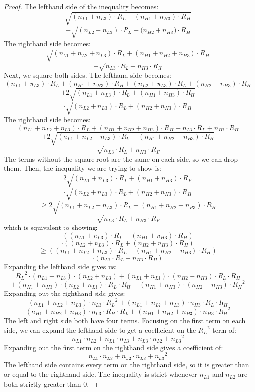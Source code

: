 \documentclass[sigconf]{acmart}
\newcommand{\p}[1]{\left( #1 \right)}
\newcommand{\nLv}[1]{\ensuremath{n_{L#1}}}
\newcommand{\nHv}[1]{\ensuremath{n_{H#1}}}
\newcommand{\RL}[0]{\ensuremath{R_L}}
\newcommand{\RH}[0]{\ensuremath{R_H}}
\newcommand{\cd}[0]{\cdot}
\begin{document}
\begin{proof}
The lefthand side of the inequality becomes: 
$$\sqrt{(\nLv{1} + \nLv{3}) \cd \RL + (\nHv{1} +\nHv{3}) \cd \RH} $$
$$+ \sqrt{(\nLv{2} + \nLv{3}) \cd \RL + (\nHv{2} + \nHv{3}}) \cd \RH$$
The righthand side becomes: 
$$\sqrt{(\nLv{1} + \nLv{2} + \nLv{3}) \cd \RL + (\nHv{1} + \nHv{2} + \nHv{3}) \cd \RH} $$
$$+ \sqrt{\nLv{3} \cd \RL + \nHv{3} \cd \RH}$$
Next, we square both sides. The lefthand side becomes: 
$$ (\nLv{1} + \nLv{3}) \cd \RL + (\nHv{1} + \nHv{3}) \cd \RH + (\nLv{2} + \nLv{3}) \cd \RL + (\nHv{2} + \nHv{3}) \cd \RH$$
$$+ 2\sqrt{(\nLv{1} + \nLv{3}) \cd \RL + (\nHv{1} + \nHv{3}) \cd \RH} $$
$$\cd \sqrt{(\nLv{2} + \nLv{3}) \cd \RL + (\nHv{2} + \nHv{3}) \cd \RH}$$
The righthand side becomes: 
$$(\nLv{1} + \nLv{2} + \nLv{3}) \cd \RL + (\nHv{1} + \nHv{2} + \nHv{3}) \cd \RH + \nLv{3} \cd \RL + \nHv{3} \cd \RH$$
$$+ 2\sqrt{(\nLv{1} + \nLv{2} + \nLv{3}) \cd \RL + (\nHv{1} + \nHv{2} + \nHv{3}) \cd \RH}$$
$$\cd  \sqrt{\nLv{3} \cd \RL + \nHv{3} \cd \RH}$$
The terms without the square root are the same on each side, so we can drop them. Then, the inequality we are trying to show is:
$$2\sqrt{(\nLv{1} + \nLv{3}) \cd \RL + (\nHv{1} + \nHv{3}) \cd \RH} $$
$$\cd  \sqrt{(\nLv{2} + \nLv{3})\cd \RL + (\nHv{2} + \nHv{3}) \cd \RH}$$
$$\geq  2\sqrt{(\nLv{1} + \nLv{2} + \nLv{3}) \cd \RL + (\nHv{1} + \nHv{2} + \nHv{3}) \cd \RH}$$
$$\cd  \sqrt{\nLv{3} \cd \RL + \nHv{3} \cd \RH}$$
which is equivalent to showing: 
$$\p{(\nLv{1} + \nLv{3}) \cd \RL + (\nHv{1} + \nHv{3}) \cd \RH} $$
$$\cd \p{(\nLv{2} + \nLv{3}) \cd \RL + (\nHv{2} + \nHv{3}) \cd \RH}$$
$$\geq \p{(\nLv{1} + \nLv{2} + \nLv{3}) \cd \RL + (\nHv{1} + \nHv{2} + \nHv{3}) \cd \RH}$$
$$\cd  \p{\nLv{3} \cd \RL + \nHv{3} \cd \RH}$$
Expanding the lefthand side gives us: 
$$\RL^2 \cd (\nLv{1} + \nLv{3}) \cd (\nLv{2} + \nLv{3}) + (\nLv{1} + \nLv{3}) \cd (\nHv{2} + \nHv{3}) \cd \RL \cd \RH$$
$$ + (\nHv{1} + \nHv{3}) \cd (\nLv{2} + \nLv{3}) \cd \RL \cd \RH + (\nHv{1} + \nHv{3}) \cd (\nHv{2} + \nHv{3}) \cd \RH^2$$
Expanding out the righthand side gives: 
$$(\nLv{1} + \nLv{2} + \nLv{3}) \cd \nLv{3} \cd \RL^2 + (\nLv{1} + \nLv{2} + \nLv{3}) \cd \nHv{3} \cd \RL \cd \RH$$
$$(\nHv{1} + \nHv{2} + \nHv{3}) \cd \nLv{3} \cd \RH \cd \RL + (\nHv{1} + \nHv{2} + \nHv{3}) \cd \nHv{3} \cd \RH^2$$
The left and right side both have four terms. Focusing on the first term on each side, we can expand the lefthand side to get a coefficient on the $\RL^2$ term of: 
$$\nLv{1} \cd \nLv{2} + \nLv{1} \cd \nLv{3} + \nLv{3} \cd \nLv{2} + \nLv{3}^2$$
Expanding out the first term on the righthand side gives a coefficient of:  
$$\nLv{1} \cd \nLv{3} + \nLv{2} \cd \nLv{3} + \nLv{3}^2$$
The lefthand side contains every term on the righthand side, so it is greater than or equal to the righthand side. The inequality is strict whenever $\nLv{1}$ and $\nLv{2}$ are both strictly greater than 0. 


\end{proof}
\end{document}
